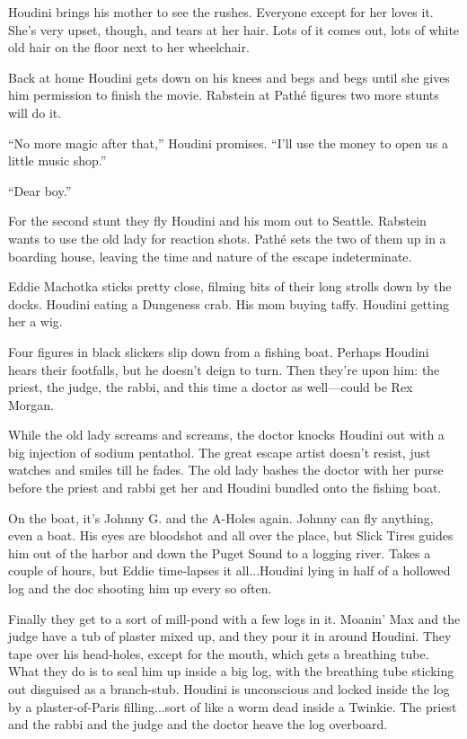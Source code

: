 Houdini brings his mother to see the rushes. Everyone except for her loves it. She's very upset, though, and tears at her hair. Lots of it comes out, lots of white old hair on the floor next to her wheelchair.

Back at home Houdini gets down on his knees and begs and begs until she gives him permission to finish the movie. Rabstein at Pathé figures two more stunts will do it.

``No more magic after that,'' Houdini promises. ``I'll use the money to open us a little music shop.''

``Dear boy.''

For the second stunt they fly Houdini and his mom out to Seattle. Rabstein wants to use the old lady for reaction shots. Pathé sets the two of them up in a boarding house, leaving the time and nature of the escape indeterminate.

Eddie Machotka sticks pretty close, filming bits of their long strolls down by the docks. Houdini eating a Dungeness crab. His mom buying taffy. Houdini getting her a wig.

Four figures in black slickers slip down from a fishing boat. Perhaps Houdini hears their footfalls, but he doesn't deign to turn. Then they're upon him: the priest, the judge, the rabbi, and this time a doctor as well—could be Rex Morgan.

While the old lady screams and screams, the doctor knocks Houdini out with a big injection of sodium pentathol. The great escape artist doesn't resist, just watches and smiles till he fades. The old lady bashes the doctor with her purse before the priest and rabbi get her and Houdini bundled onto the fishing boat.

On the boat, it's Johnny G. and the A-Holes again. Johnny can fly anything, even a boat. His eyes are bloodshot and all over the place, but Slick Tires guides him out of the harbor and down the Puget Sound to a logging river. Takes a couple of hours, but Eddie time-lapses it all...Houdini lying in half of a hollowed log and the doc shooting him up every so often.

Finally they get to a sort of mill-pond with a few logs in it. Moanin' Max and the judge have a tub of plaster mixed up, and they pour it in around Houdini. They tape over his head-holes, except for the mouth, which gets a breathing tube. What they do is to seal him up inside a big log, with the breathing tube sticking out disguised as a branch-stub. Houdini is unconscious and locked inside the log by a plaster-of-Paris filling...sort of like a worm dead inside a Twinkie. The priest and the rabbi and the judge and the doctor heave the log overboard.


